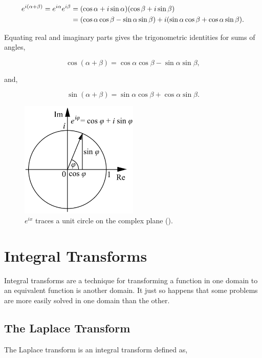 \documentclass[11pt]{amsart}
\begin{document}
\begin{align}
e^{i(\alpha + \beta)} = e^{i\alpha}e^{i\beta} &= (\cos \alpha + i\sin \alpha)(\cos \beta + i\sin \beta) \notag \\
&= (\cos\alpha\cos\beta - \sin\alpha\sin\beta) + i(\sin\alpha\cos\beta + \cos\alpha\sin\beta).\notag
\end{align}

Equating real and imaginary parts gives the trigonometric identities for sums of angles,

$$\cos (\alpha + \beta) = \cos\alpha\cos\beta - \sin\alpha\sin\beta,$$

and,

$$\sin (\alpha + \beta) = \sin\alpha\cos\beta + \cos\alpha\sin\beta.$$

\begin{figure}[!ht]
\centering
\includegraphics[width=0.5\textwidth]{Figures/eulersformula.png}
\caption{$e^{ix}$ traces a unit circle on the complex plane (\cite{eulerformula}).}
\label{fig:eulersformula}
\end{figure}

\section{Integral Transforms}

Integral transforms are a technique for transforming a function in one domain to an equivalent function is another domain. It just so happens that some problems are more easily solved in one domain than the other.

\subsection{The Laplace Transform}

The Laplace transform is an integral transform defined as,
\end{document}
